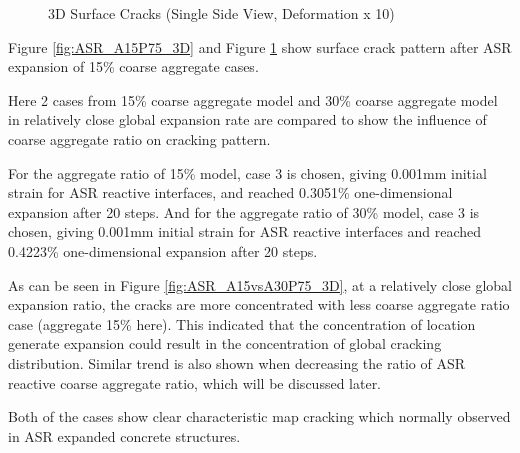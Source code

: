 \begin{figure}[!h]
  \caption{3D Surface Cracks (Single Side View, Deformation x 10)}
  \label{fig:ASR_A15P75_3DS}
\end{figure}

Figure \ref{fig:ASR_A15P75_3D} and Figure \ref{fig:ASR_A15P75_3DS} show surface crack pattern after ASR expansion of 15\% coarse aggregate cases.

Here 2 cases from 15\% coarse aggregate model and 30\% coarse aggregate model in relatively close global expansion rate are compared to show the influence of coarse aggregate ratio on cracking pattern.

For the aggregate ratio of 15\% model, case 3 is chosen, giving 0.001mm initial strain for ASR reactive interfaces, and reached 0.3051\% one-dimensional expansion after 20 steps. And for the aggregate ratio of 30\% model, case 3 is chosen, giving 0.001mm initial strain for ASR reactive interfaces and reached 0.4223\% one-dimensional expansion after 20 steps.


As can be seen in Figure \ref{fig:ASR_A15vsA30P75_3D}, at a relatively close global expansion ratio, the cracks are more concentrated with less coarse aggregate ratio case (aggregate 15\% here). This indicated that the concentration of location generate expansion could result in the concentration of global cracking distribution. Similar trend is also shown when decreasing the ratio of ASR reactive coarse aggregate ratio, which will be discussed later.

Both of the cases show clear characteristic map cracking which normally observed in ASR expanded concrete structures.

